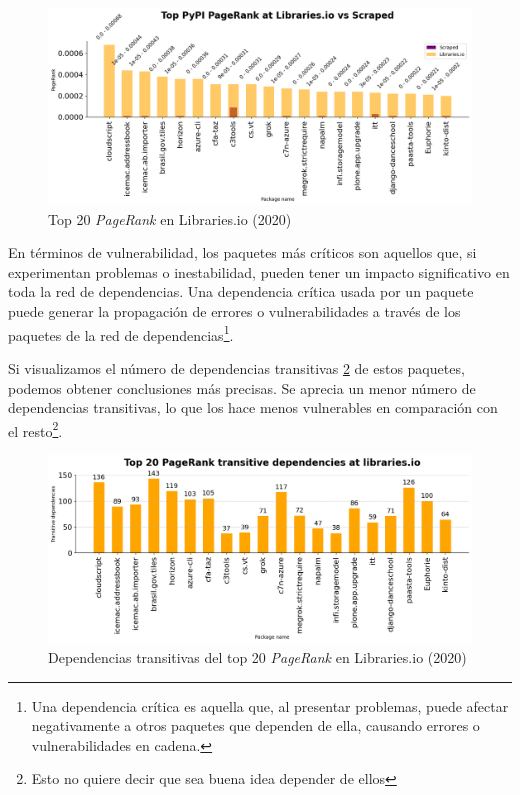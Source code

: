 \begin{figure}[ht!]
    \begin{center}
        \includegraphics[width=1\textwidth]{img/pypi/libio_t20_pr_comparison.png}
        \caption{Top 20 \textit{PageRank} en Libraries.io (2020)}
        \label{fig:Top 20 pagerank en Libraries.io}
    \end{center}
\end{figure}


En términos de vulnerabilidad, los paquetes más críticos son aquellos que, si experimentan problemas o inestabilidad,
pueden tener un impacto significativo en toda la red de dependencias. Una dependencia crítica usada por un paquete
puede generar la propagación de errores o vulnerabilidades a través de los paquetes de la red de dependencias\footnote{Una dependencia crítica es aquella que, al presentar problemas, puede afectar negativamente a
    otros paquetes que dependen de ella, causando errores o vulnerabilidades en cadena.}.

Si visualizamos el número de dependencias transitivas \ref{fig:Dependencias transitivas del top 20 pagerank en Libraries.io}
de estos paquetes, podemos obtener conclusiones más precisas.
Se aprecia un menor número de dependencias transitivas, lo que los hace menos vulnerables en
comparación con el resto\footnote{Esto no quiere decir que sea buena idea depender de ellos}.

\begin{figure}[ht!]
    \begin{center}
        \includegraphics[width=1\textwidth]{img/pypi/transitive libraries.png}
        \caption{Dependencias transitivas del top 20 \textit{PageRank} en Libraries.io (2020)}
        \label{fig:Dependencias transitivas del top 20 pagerank en Libraries.io}
    \end{center}
\end{figure}

